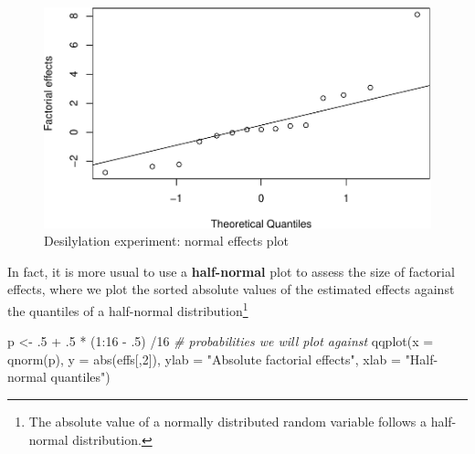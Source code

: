 \documentclass[
]{book}
\newenvironment{Shaded}{\begin{snugshade}}{\end{snugshade}}
\newcommand{\AttributeTok}[1]{\textcolor[rgb]{0.77,0.63,0.00}{#1}}
\newcommand{\CommentTok}[1]{\textcolor[rgb]{0.56,0.35,0.01}{\textit{#1}}}
\newcommand{\DecValTok}[1]{\textcolor[rgb]{0.00,0.00,0.81}{#1}}
\newcommand{\FunctionTok}[1]{\textcolor[rgb]{0.00,0.00,0.00}{#1}}
\newcommand{\NormalTok}[1]{#1}
\newcommand{\OtherTok}[1]{\textcolor[rgb]{0.56,0.35,0.01}{#1}}
\newcommand{\SpecialCharTok}[1]{\textcolor[rgb]{0.00,0.00,0.00}{#1}}
\newcommand{\StringTok}[1]{\textcolor[rgb]{0.31,0.60,0.02}{#1}}
\theoremstyle{definition}
\theoremstyle{definition}
\theoremstyle{definition}
\theoremstyle{definition}
\theoremstyle{remark}
\begin{document}
\begin{figure}

{\centering \includegraphics{bookdown_math3014-6027_files/figure-latex/desilylation-effects-plot1-1} 

}

\caption{Desilylation experiment: normal effects plot}\label{fig:desilylation-effects-plot1}
\end{figure}

In fact, it is more usual to use a \textbf{half-normal} plot to assess the size of factorial effects, where we plot the sorted absolute values of the estimated effects against the quantiles of a half-normal distribution\footnote{The absolute value of a normally distributed random variable follows a half-normal distribution.}

\begin{Shaded}
\begin{Highlighting}[]
\NormalTok{p }\OtherTok{\textless{}{-}}\NormalTok{ .}\DecValTok{5} \SpecialCharTok{+}\NormalTok{ .}\DecValTok{5} \SpecialCharTok{*}\NormalTok{ (}\DecValTok{1}\SpecialCharTok{:}\DecValTok{16} \SpecialCharTok{{-}}\NormalTok{ .}\DecValTok{5}\NormalTok{) }\SpecialCharTok{/}\DecValTok{16} \CommentTok{\# probabilities we will plot against}
\FunctionTok{qqplot}\NormalTok{(}\AttributeTok{x =} \FunctionTok{qnorm}\NormalTok{(p), }\AttributeTok{y =} \FunctionTok{abs}\NormalTok{(effs[,}\DecValTok{2}\NormalTok{]), }\AttributeTok{ylab =} \StringTok{"Absolute factorial effects"}\NormalTok{, }
       \AttributeTok{xlab =} \StringTok{"Half{-}normal quantiles"}\NormalTok{)}
\end{Highlighting}
\end{Shaded}
\end{document}
